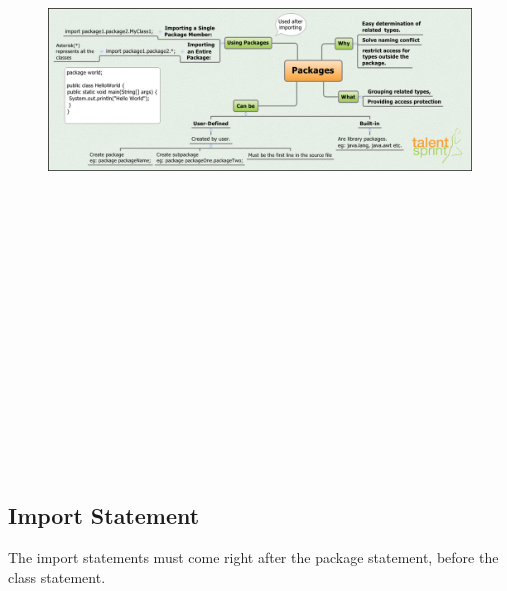 \documentclass[11pt,a4paper]{article}
\begin{document}
\vfill{\ }
\begin{figure}[H]
 \begin{center}
   \includegraphics[angle=90,height=20cm, width=13cm]{Package-MM.png}
  
 \end{center}
 \end{figure}
 \subsection*{Import Statement}
 The import statements must come right after the package statement, before the class statement.
\end{document}
